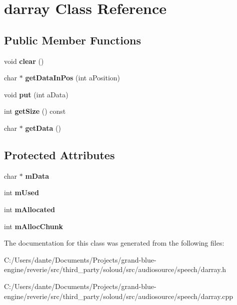 \hypertarget{classdarray}{}\section{darray Class Reference}
\label{classdarray}
\subsection*{Public Member Functions}
\begin{DoxyCompactItemize}
\item 
\mbox{\label{classdarray_aff44b46957c5e95087574308336d75b9}} 
void {\bfseries clear} ()
\item 
\mbox{\label{classdarray_a07ae9b43293886decdcc9cd211e3ff97}} 
char $\ast$ {\bfseries get\+Data\+In\+Pos} (int a\+Position)
\item 
\mbox{\label{classdarray_ac40fcb762dbe867c95a33f81048f543b}} 
void {\bfseries put} (int a\+Data)
\item 
\mbox{\label{classdarray_a69a1b708e449bea47edc1a5761c3b09c}} 
int {\bfseries get\+Size} () const
\item 
\mbox{\label{classdarray_ac6c628af61f51ffb19a2c1f160c42c87}} 
char $\ast$ {\bfseries get\+Data} ()
\end{DoxyCompactItemize}
\subsection*{Protected Attributes}
\begin{DoxyCompactItemize}
\item 
\mbox{\label{classdarray_abe8ee90da99a94cc90252542eb211125}} 
char $\ast$ {\bfseries m\+Data}
\item 
\mbox{\label{classdarray_a205e195fb9f1a78506fdc1c3670b7c2c}} 
int {\bfseries m\+Used}
\item 
\mbox{\label{classdarray_aad19834b7b6c5e2313e61d838b7fa310}} 
int {\bfseries m\+Allocated}
\item 
\mbox{\label{classdarray_a80fbac7ca930580fbb3bafbebeab0ce5}} 
int {\bfseries m\+Alloc\+Chunk}
\end{DoxyCompactItemize}


The documentation for this class was generated from the following files\+:\begin{DoxyCompactItemize}
\item 
C\+:/\+Users/dante/\+Documents/\+Projects/grand-\/blue-\/engine/reverie/src/third\+\_\+party/soloud/src/audiosource/speech/darray.\+h\item 
C\+:/\+Users/dante/\+Documents/\+Projects/grand-\/blue-\/engine/reverie/src/third\+\_\+party/soloud/src/audiosource/speech/darray.\+cpp\end{DoxyCompactItemize}
